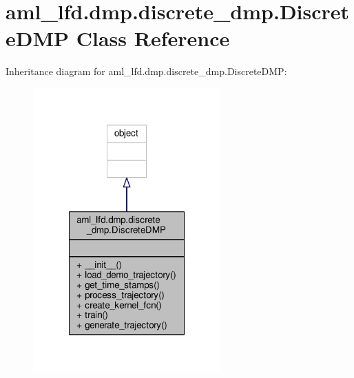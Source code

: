 \hypertarget{classaml__lfd_1_1dmp_1_1discrete__dmp_1_1_discrete_d_m_p}{\section{aml\-\_\-lfd.\-dmp.\-discrete\-\_\-dmp.\-Discrete\-D\-M\-P Class Reference}
\label{classaml__lfd_1_1dmp_1_1discrete__dmp_1_1_discrete_d_m_p}
}


Inheritance diagram for aml\-\_\-lfd.\-dmp.\-discrete\-\_\-dmp.\-Discrete\-D\-M\-P\-:
\nopagebreak
\begin{figure}[H]
\begin{center}
\leavevmode
\includegraphics[width=204pt]{classaml__lfd_1_1dmp_1_1discrete__dmp_1_1_discrete_d_m_p__inherit__graph}
\end{center}
\end{figure}


